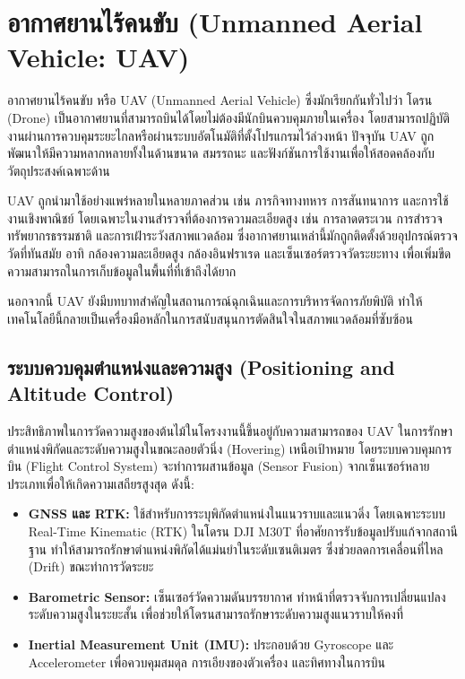 \section{อากาศยานไร้คนขับ (Unmanned Aerial Vehicle: UAV)}
อากาศยานไร้คนขับ หรือ UAV (Unmanned Aerial Vehicle) ซึ่งมักเรียกกันทั่วไปว่า โดรน (Drone) เป็นอากาศยานที่สามารถบินได้โดยไม่ต้องมีนักบินควบคุมภายในเครื่อง โดยสามารถปฏิบัติงานผ่านการควบคุมระยะไกลหรือผ่านระบบอัตโนมัติที่ตั้งโปรแกรมไว้ล่วงหน้า ปัจจุบัน UAV ถูกพัฒนาให้มีความหลากหลายทั้งในด้านขนาด สมรรถนะ และฟังก์ชันการใช้งานเพื่อให้สอดคล้องกับวัตถุประสงค์เฉพาะด้าน \cite{thaipbs_article}

UAV ถูกนำมาใช้อย่างแพร่หลายในหลายภาคส่วน เช่น ภารกิจทางทหาร การสันทนาการ และการใช้งานเชิงพาณิชย์ โดยเฉพาะในงานสำรวจที่ต้องการความละเอียดสูง เช่น การลาดตระเวน การสำรวจทรัพยากรธรรมชาติ และการเฝ้าระวังสภาพแวดล้อม ซึ่งอากาศยานเหล่านี้มักถูกติดตั้งด้วยอุปกรณ์ตรวจวัดที่ทันสมัย อาทิ กล้องความละเอียดสูง กล้องอินฟราเรด และเซ็นเซอร์ตรวจวัดระยะทาง เพื่อเพิ่มขีดความสามารถในการเก็บข้อมูลในพื้นที่ที่เข้าถึงได้ยาก \cite{gistda_news} 

นอกจากนี้ UAV ยังมีบทบาทสำคัญในสถานการณ์ฉุกเฉินและการบริหารจัดการภัยพิบัติ ทำให้เทคโนโลยีนี้กลายเป็นเครื่องมือหลักในการสนับสนุนการตัดสินใจในสภาพแวดล้อมที่ซับซ้อน

\subsection{ระบบควบคุมตำแหน่งและความสูง (Positioning and Altitude Control)}
ประสิทธิภาพในการวัดความสูงของต้นไม้ในโครงงานนี้ขึ้นอยู่กับความสามารถของ UAV ในการรักษาตำแหน่งพิกัดและระดับความสูงในขณะลอยตัวนิ่ง (Hovering) เหนือเป้าหมาย โดยระบบควบคุมการบิน (Flight Control System) จะทำการผสานข้อมูล (Sensor Fusion) จากเซ็นเซอร์หลายประเภทเพื่อให้เกิดความเสถียรสูงสุด ดังนี้:

\begin{itemize}
        \item \textbf{GNSS และ RTK:} ใช้สำหรับการระบุพิกัดตำแหน่งในแนวราบและแนวดิ่ง โดยเฉพาะระบบ Real-Time Kinematic (RTK) ในโดรน DJI M30T ที่อาศัยการรับข้อมูลปรับแก้จากสถานีฐาน ทำให้สามารถรักษาตำแหน่งพิกัดได้แม่นยำในระดับเซนติเมตร ซึ่งช่วยลดการเคลื่อนที่ไหล (Drift) ขณะทำการวัดระยะ \cite{dji_m30t_specs}
        \item \textbf{Barometric Sensor:} เซ็นเซอร์วัดความดันบรรยากาศ ทำหน้าที่ตรวจจับการเปลี่ยนแปลงระดับความสูงในระยะสั้น เพื่อช่วยให้โดรนสามารถรักษาระดับความสูงแนวราบให้คงที่
        \item \textbf{Inertial Measurement Unit (IMU):} ประกอบด้วย Gyroscope และ Accelerometer เพื่อควบคุมสมดุล การเอียงของตัวเครื่อง และทิศทางในการบิน
\end{itemize}

